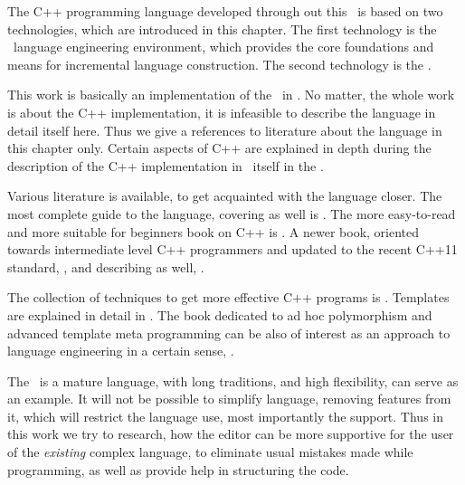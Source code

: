 
The C++ programming language developed through out this \MT\ is based on two technologies, which are 
introduced in this chapter. The first technology is the \jbmps\ language engineering environment, which 
provides the core foundations and means for incremental language construction. The second technology is
the \mbdp. 








This work is basically an implementation of the \cpppl\ in \jbmps. No matter, the whole work 
is about the C++ implementation, it is infeasible to describe the language in detail itself
here. Thus we give a references to literature about the language in this chapter only. Certain 
aspects of C++ are explained in depth during the description of the C++ implementation in \jbmps\ itself in 
the .

Various literature is available, to get acquainted with the language closer. The most complete
guide to the language, covering  as well is \cite{stroustrupcpp2000}. The more 
easy-to-read and more suitable for beginners book on C++ is \cite{schildtcpp}. A newer book,
oriented towards intermediate level C++ programmers and updated to the recent C++11 standard, \cite{cpp11}, and describing 
 as well, \cite{pratacpp}.

The collection of techniques to get more effective C++ programs is \cite{meyerseffcpp}. Templates are explained in 
detail in \cite{josuttistemplates}. The book dedicated to ad hoc polymorphism and advanced template meta programming can be 
also of interest as an approach to language engineering in a certain sense, \cite{alexandrescumeta}.

The \cpppl\ is a mature language, with long traditions, and high flexibility, \cite{alexandrescu} can serve as an example. 
It will not be possible to simplify language, removing features from it, which will restrict the language use, 
most importantly the  support. Thus in this work we try to research, how the editor can be more supportive 
for the user of the \emph{existing} complex language, to eliminate usual mistakes made while programming, as 
well as provide help in structuring the code.